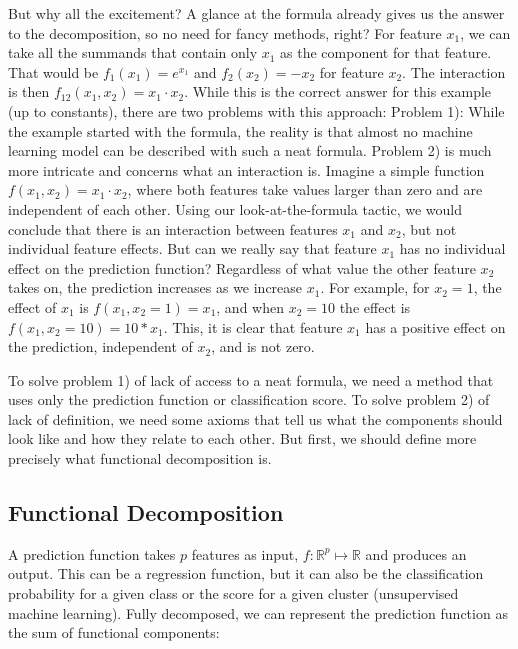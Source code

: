 \documentclass[
  12pt,
]{krantz}
\begin{document}
But why all the excitement?
A glance at the formula already gives us the answer to the decomposition, so no need for fancy methods, right?
For feature \(x_1\), we can take all the summands that contain only \(x_1\) as the component for that feature.
That would be \(f_1(x_1) = e^{x_1}\) and \(f_2(x_2) = -x_2\) for feature \(x_2\).
The interaction is then \(f_{12}(x_{1},x_{2}) = x_1 \cdot x_2\).
While this is the correct answer for this example (up to constants), there are two problems with this approach:
Problem 1): While the example started with the formula, the reality is that almost no machine learning model can be described with such a neat formula.
Problem 2) is much more intricate and concerns what an interaction is.
Imagine a simple function \(f(x_1,x_2) = x_1 \cdot x_2\), where both features take values larger than zero and are independent of each other.
Using our look-at-the-formula tactic, we would conclude that there is an interaction between features \(x_1\) and \(x_2\), but not individual feature effects.
But can we really say that feature \(x_1\) has no individual effect on the prediction function?
Regardless of what value the other feature \(x_2\) takes on, the prediction increases as we increase \(x_1\).
For example, for \(x_2 = 1\), the effect of \(x_1\) is \(f(x_1, x_2 = 1) = x_1\), and when \(x_2 = 10\) the effect is \(f(x_1, x_2 = 10) = 10 * x_1\).
This, it is clear that feature \(x_1\) has a positive effect on the prediction, independent of \(x_2\), and is not zero.

To solve problem 1) of lack of access to a neat formula, we need a method that uses only the prediction function or classification score.
To solve problem 2) of lack of definition, we need some axioms that tell us what the components should look like and how they relate to each other.
But first, we should define more precisely what functional decomposition is.

\hypertarget{functional-decomposition}{%
\subsection{Functional Decomposition}\label{functional-decomposition}}

A prediction function takes \(p\) features as input, \(f: \mathbb{R}^p \mapsto \mathbb{R}\) and produces an output.
This can be a regression function, but it can also be the classification probability for a given class or the score for a given cluster (unsupervised machine learning).
Fully decomposed, we can represent the prediction function as the sum of functional components:
\end{document}

